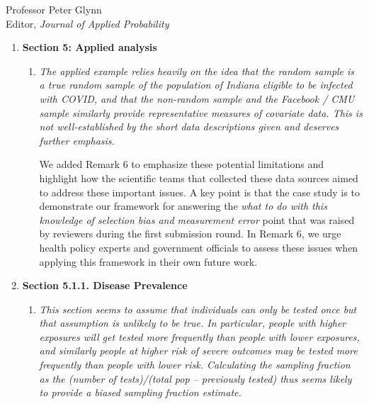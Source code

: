 \documentclass[11pt]{letter} %
\begin{document}
\begin{letter}{Professor
	Peter Glynn\\
	Editor, {\em Journal of Applied Probability}}
\begin{enumerate}
\begin{enumerate}
	We clarify this notation in Section 4.3.  Specifically, the SEIR model is used to generate the number of new weekly cases which allows us to calculate the number of individuals with an active infection within each strata (i.e.~$I_{k,t}$ for the $k$th strata).  We then can use this to calculate the posterior mean for the active infection rate per strata,~$\mu_k$.
	\vspace{5mm}
\end{enumerate}
\item {\bf Section 5: Applied analysis}
\begin{enumerate}
	\item {\it The applied example relies heavily on the idea that the random sample is a true random sample of the population of Indiana eligible to be infected with COVID, and that the non-random sample and the Facebook / CMU sample similarly provide representative measures of covariate data. This is not well-established by the short data descriptions given and deserves further emphasis.}
	\vspace{5mm}

	We added Remark 6 to emphasize these potential limitations and highlight how the scientific teams that collected these data sources aimed to address these important issues. A key point is that the case study is to demonstrate our framework for answering the \emph{what to do with this knowledge of selection bias and measurement error} point that was raised by reviewers during the first submission round.  In Remark 6, we urge health policy experts and government officials to assess these issues when applying this framework in their own future work.
	\vspace{5mm}
\end{enumerate}
\item {\bf Section 5.1.1. Disease Prevalence}
\begin{enumerate}
	\item {\it This section seems to assume that individuals can only be tested once but that assumption is unlikely to be true. In particular, people with higher exposures will get tested more frequently than people with lower exposures, and similarly people at higher risk of severe outcomes may be tested more frequently than people with lower risk. Calculating the sampling fraction as the (number of tests)/(total pop – previously tested) thus seems likely to provide a biased sampling fraction estimate.}
	\vspace{5mm}


\end{enumerate}
\end{enumerate}
\end{letter}
\end{document}
